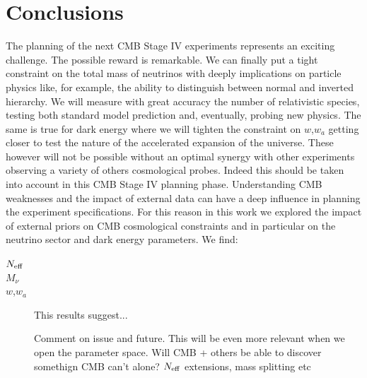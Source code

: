 \documentclass[aps,prd,reprint,superscriptaddress]{revtex4-1}
\begin{document}
\section{Conclusions  \label{sec:conclusions}}
The planning of the next CMB Stage IV experiments represents an exciting challenge. The possible reward is remarkable. We can finally put a tight constraint on the total mass of neutrinos with deeply implications on particle physics like, for example, the ability to distinguish between normal and inverted hierarchy. We will measure with great accuracy the number of relativistic species, testing both standard model prediction and, eventually, probing new physics. The same is true for dark energy where we will tighten the constraint on $w$,$w_{a}$ getting closer to test the nature of the accelerated expansion of the universe. These however will not be possible without an optimal synergy with other experiments observing a variety of others cosmological probes.
Indeed this should be taken into account in this CMB Stage IV planning phase. Understanding CMB weaknesses and the impact of external data can have a deep influence in planning the experiment specifications.
For this reason in this work we explored the impact of external priors on CMB cosmological constraints and in particular on the neutrino sector and dark energy parameters.
We find:
\begin{description}
\item[$N_{\rm eff}$] 
\item[$M_{\nu}$] 
\item[$w$,$w_{a}$] 
This results suggest...

Comment on issue and future. This will be even more relevant when we open the parameter space. Will CMB + others be able to discover somethign CMB can't alone? $N_{\rm eff}$ extensions, mass splitting etc

\end{description}



%
\end{document}
